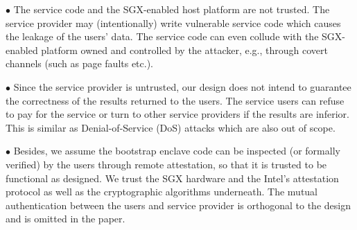 {{%

\vspace{2pt}\noindent$\bullet${ The service code and the SGX-enabled host platform are not trusted.} The service provider may (intentionally) write vulnerable service code which causes the leakage of the users' data.
The service code can even collude with the SGX-enabled platform owned and controlled by the attacker, e.g., through covert channels (such as page faults etc.). 


\vspace{2pt}\noindent$\bullet$ Since the service provider is untrusted, our design does not intend to guarantee the correctness of the results returned to the users. The service users can refuse to pay for the service or turn to other service providers if the results are inferior. This is similar as Denial-of-Service (DoS) attacks which are also out of scope.

\vspace{2pt}\noindent$\bullet$ Besides, we assume the bootstrap enclave code can be inspected (or formally verified) by the users through remote attestation, so that it is trusted to be functional as designed. We trust the SGX hardware and the Intel's attestation protocol as well as the cryptographic algorithms underneath. The mutual authentication between the users and service provider is orthogonal to the design and is omitted in the paper.

}}
